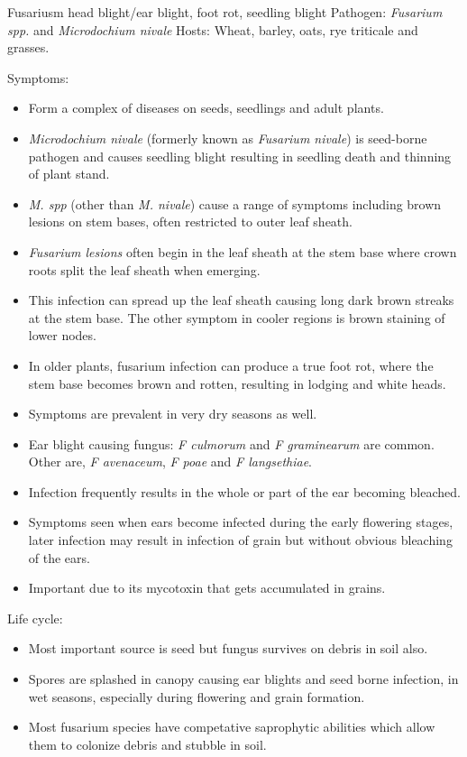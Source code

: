 \documentclass[
  openany]{book}
\providecommand{\tightlist}{%
  \setlength{\itemsep}{0pt}\setlength{\parskip}{0pt}}
\begin{document}
Fusariusm head blight/ear blight, foot rot, seedling blight
Pathogen: \emph{Fusarium spp.} and \emph{Microdochium nivale}
Hosts: Wheat, barley, oats, rye triticale and grasses.

Symptoms:

\begin{itemize}
\tightlist
\item
  Form a complex of diseases on seeds, seedlings and adult plants.
\item
  \emph{Microdochium nivale} (formerly known as \emph{Fusarium nivale}) is seed-borne pathogen and causes seedling blight resulting in seedling death and thinning of plant stand.
\item
  \emph{M. spp} (other than \emph{M. nivale}) cause a range of symptoms including brown lesions on stem bases, often restricted to outer leaf sheath.
\item
  \emph{Fusarium lesions} often begin in the leaf sheath at the stem base where crown roots split the leaf sheath when emerging.
\item
  This infection can spread up the leaf sheath causing long dark brown streaks at the stem base. The other symptom in cooler regions is brown staining of lower nodes.
\item
  In older plants, fusarium infection can produce a true foot rot, where the stem base becomes brown and rotten, resulting in lodging and white heads.
\item
  Symptoms are prevalent in very dry seasons as well.
\item
  Ear blight causing fungus: \emph{F culmorum} and \emph{F graminearum} are common. Other are, \emph{F avenaceum}, \emph{F poae} and \emph{F langsethiae}.
\item
  Infection frequently results in the whole or part of the ear becoming bleached.
\item
  Symptoms seen when ears become infected during the early flowering stages, later infection may result in infection of grain but without obvious bleaching of the ears.
\item
  Important due to its mycotoxin that gets accumulated in grains.
\end{itemize}

Life cycle:

\begin{itemize}
\tightlist
\item
  Most important source is seed but fungus survives on debris in soil also.
\item
  Spores are splashed in canopy causing ear blights and seed borne infection, in wet seasons, especially during flowering and grain formation.
\item
  Most fusarium species have competative saprophytic abilities which allow them to colonize debris and stubble in soil.
\end{itemize}
\end{document}
